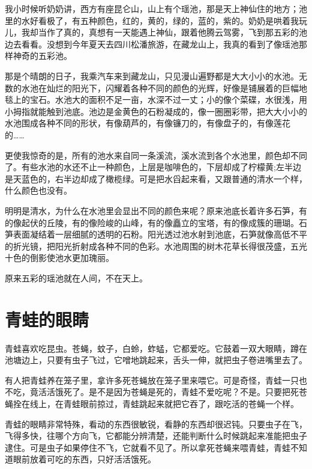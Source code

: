 \documentclass[12pt,UTF-8,openany]{ctexbook}
\begin{document}
\begin{large}
    
    我小时候听奶奶讲，西方有座昆仑山，山上有个瑶池，那是天上神仙住的地方；池里的水好看极了，有五种颜色，红的，黄的，绿的，蓝的，紫的。奶奶是哄着我玩儿，我却当作了真的，真想有一天能遇上神仙，跟着他腾云驾雾，飞到那五彩的池边去看看。没想到今年夏天去四川松潘旅游，在藏龙山上，我真的看到了像瑶池那样神奇的五彩池。
    
    那是个晴朗的日子，我乘汽车来到藏龙山，只见漫山遍野都是大大小小的水池。无数的水池在灿烂的阳光下，闪耀着各种不同的颜色的光辉，好像是铺展着的巨幅地毯上的宝石。水池大的面积不足一亩，水深不过一丈；小的像个菜碟，水很浅，用小拇指就能触到池底。池边是金黄色的石粉凝成的，像一圈圈彩带，把大大小小的水池围成各种不同的形状，有像葫芦的，有像镰刀的，有像盘子的，有像莲花的……
    
    更使我惊奇的是，所有的池水来自同一条溪流，溪水流到各个水池里，颜色却不同了。有些水池的水还不止一种颜色，上层是咖啡色的，下层却成了柠檬黄;左半边是天蓝色的，右半边却成了橄榄绿。可是把水舀起来看，又跟普通的清水一个样，什么颜色也没有。
    
    明明是清水，为什么在水池里会显出不同的颜色来呢？原来池底长着许多石笋，有的像起伏的丘陵，有的像险峻的山峰，有的像矗立的宝塔，有的像成簇的珊瑚。石笋表面凝结着一层细腻的透明的石粉。阳光透过池水射到池底，石笋就像高低不平的折光镜，把阳光折射成各种不同的色彩。水池周围的树木花草长得很茂盛，五光十色的倒影使池水更加瑰丽。
    
    原来五彩的瑶池就在人间，不在天上。
    
\end{large}



\chapter{青蛙的眼睛}

\begin{large}
    
    青蛙喜欢吃昆虫。苍蝇，蚊子，白蛉，蚱蜢，它都爱吃。它鼓着一双大眼睛，蹲在池塘边上，只要有虫子飞过，它噌地跳起来，舌头一伸，就把虫子卷进嘴里去了。
    
    有人把青蛙养在笼子里，拿许多死苍蝇放在笼子里来喂它。可是奇怪，青蛙一只也不吃，竟活活饿死了。是不是因为苍蝇是死的，青蛙不爱吃呢？不是。只要把死苍蝇拴在线上，在青蛙眼前掠过，青蛙跳起来就把它吞了，跟吃活的苍蝇一个样。
    
    青蛙的眼睛非常特殊，看动的东西很敏锐，看静的东西却很迟钝。只要虫子在飞，飞得多快，往哪个方向飞，它都能分辨清楚，还能判断什么时候跳起来准能把虫子逮住。可是虫子如果停住不飞，它就看不见了。所以拿死苍蝇来喂青蛙，青蛙不知道眼前放着可吃的东西，只好活活饿死。
    
\end{large}
\end{document}

